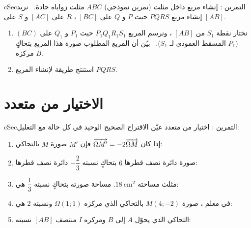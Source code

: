 \documentclass[12pt,a4paper]{article}
\newenvironment{BOX}[2]{\begin{otherlanguage}{english}\begin{arbox}{#1}{#2}}{\end{arbox}\end{otherlanguage}}
\newcounter{exo}
\newenvironment{tamrin}[1]{\stepcounter{exo}\begin{BOX}{cSec}{التمرين \theexo: #1}}{\end{BOX}}
\begin{document}
\begin{tamrin}{إنشاء مربع داخل مثلث (تمرين نموذجي)}
$ABC$ مثلث زواياه حادة. \ نريد إنشاء مربع $PQRS$ حيث $P$ و $Q$ على $[BC]$ ، $R$ على $[AC]$ و $S$ على $[AB]$.
\begin{enumerate}
\item نختار نقطة $S_1$ من $[AB]$ ، ونرسم المربع $P_1Q_1R_1S_1$ حيث $P_1$ و $Q_1$ على $(BC)$ ($P_1$ المسقط العمودي لـ $S_1$). \ بيّن أن المربع المطلوب صورة هذا المربع بتحاكٍ مركزه $B$.
\item استنتج طريقة لإنشاء المربع $PQRS$.
\end{enumerate}
\end{tamrin}

\section{الاختيار من متعدد}
\begin{tamrin}{اختيار من متعدد}
عيّن الاقتراح الصحيح الوحيد في كل حالة مع التعليل:
\begin{enumerate}
\item إذا كان $\overrightarrow{\Omega M'}=-2\overrightarrow{\Omega M}$ فإن $M'$ صورة $M$ بالتحاكي:
\item صورة دائرة نصف قطرها $6$ بتحاكٍ نسبته $-\dfrac23$ دائرة نصف قطرها:
\item مثلث مساحته $18\ \text{cm}^2$. مساحة صورته بتحاكٍ نسبته $\dfrac13$ هي:
\item في معلم ، صورة $M(4;-2)$ بالتحاكي الذي مركزه $\Omega(1;1)$ ونسبته $2$ هي:
\item التحاكي الذي يحوّل $A$ إلى $B$ ومركزه $I$ منتصف $[AB]$ نسبته:
\end{enumerate}
\end{tamrin}
\end{document}
